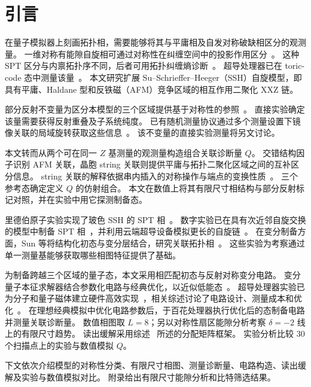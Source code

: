 \section{引言}
\label{sec:intro}

在量子模拟器上刻画拓扑相，需要能够将其与平庸相及自发对称破缺相区分的观测量。
一维对称有能隙自旋相可通过对称性在纠缠空间中的投影作用区分~\cite{chen2011classification,schuch2011classifying}。
这种 SPT 区分与内禀拓扑序不同，后者可用拓扑纠缠熵诊断~\cite{kitaev2006topological,levin2006detecting}。
超导处理器已在 toric-code 态中测量该量~\cite{satzinger2021realizing}。
本文研究扩展 Su--Schrieffer--Heeger（SSH）自旋模型，即具有平庸、Haldane 型和反铁磁（AFM）竞争区域的相互作用二聚化 XXZ 链。

部分反射不变量为区分本模型的三个区域提供基于对称性的参照~\cite{elben2020manybody}。
直接实验确定该量需要获得反射重叠及子系统纯度。
已有随机测量协议通过多个测量设置下镜像关联的局域旋转获取这些信息~\cite{elben2020manybody}。
该不变量的直接实验测量将另文讨论。

本文转而从两个可在同一 $Z$ 基测量的观测量构造组合关联诊断量 $Q$。
交错结构因子识别 AFM 关联，晶胞 string 关联则提供平庸与拓扑二聚化区域之间的互补区分信息。
string 关联的解释依据串内插入的对称操作与端点的变换性质~\cite{pollmann2012detection,haegeman2012order}。
三个参考态确定定义 $Q$ 的仿射组合。
本文在数值上将其有限尺寸相结构与部分反射标记对照，并在实验中用它探测制备态。

里德伯原子实验实现了玻色 SSH 的 SPT 相~\cite{deleseleuc2019observation}。
数字实验已在具有次近邻自旋交换的模型中制备 SPT 相~\cite{tan2023realizing}，并利用云端超导设备模拟更长的自旋链~\cite{yu2023simulating}。
在变分制备方面，Sun 等将结构化初态与变分层结合，研究关联拓扑相~\cite{sun2023efficient}。
这些实验为考察通过单一测量基能够获取哪些相图特征提供了基础。

为制备跨越三个区域的量子态，本文采用相匹配初态与反射对称变分电路。
变分量子本征求解器结合参数化电路与经典优化，以近似低能态~\cite{peruzzo2014variational}。
超导处理器实验已为分子和量子磁体建立硬件高效实现~\cite{kandala2017hardware}，相关综述讨论了电路设计、测量成本和优化~\cite{cerezo2021variational,tilly2022variational}。
在理想经典模拟中优化电路参数后，于百花处理器执行优化后的态制备电路并测量关联诊断量。
数值相图取 $L=8$；另以对称性扇区能隙分析考察 $\delta=-2$ 线上的有限尺寸趋势。
读出缓解采用综述~\cite{endo2021hybrid,cai2023quantum} 所述的分配矩阵框架。
实验分析比较 $30$ 个扫描点上的实验与数值模拟 $Q$。

下文依次介绍模型的对称性分类、有限尺寸相图、测量诊断量、电路构造、读出缓解及实验与数值模拟对比。
附录给出有限尺寸能隙分析和比特筛选结果。
